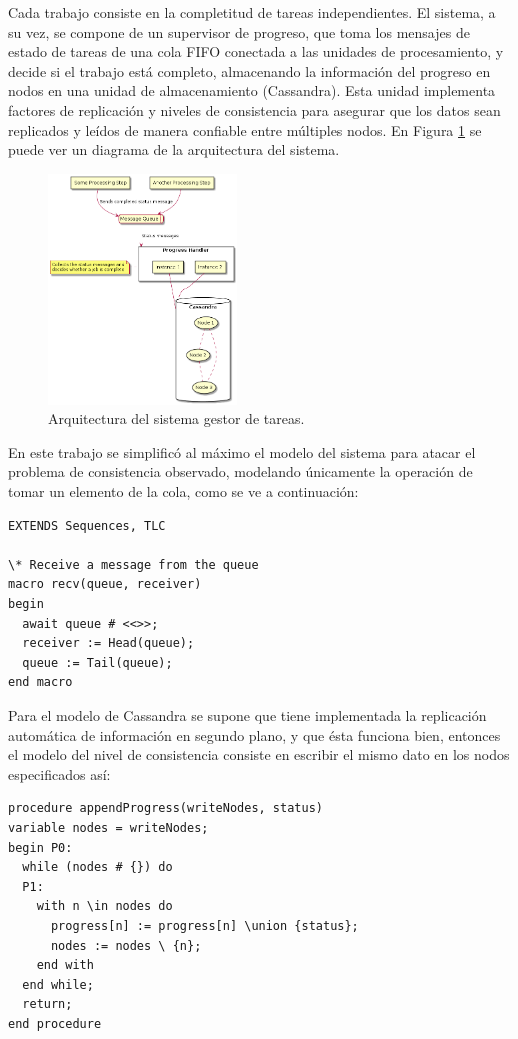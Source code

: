 \documentclass[runningheads]{llncs}
\begin{document}
Cada trabajo consiste en la completitud de tareas independientes. El sistema, a su vez, se compone de un supervisor de progreso, que toma los mensajes de estado de tareas de una cola FIFO conectada a las unidades de procesamiento, y decide si el trabajo está completo, almacenando la información del progreso en nodos en una unidad de almacenamiento (Cassandra). Esta unidad implementa factores de replicación y niveles de consistencia para asegurar que los datos sean replicados y leídos de manera confiable entre múltiples nodos. En Figura \ref{caso_estudio} se puede ver un diagrama de la arquitectura del sistema. 

\begin{figure}
    \caption{Arquitectura del sistema gestor de tareas.}\label{caso_estudio}
    \includegraphics[width=5cm]{formalizing-the-system.png}
    \centering
\end{figure}

En este trabajo se simplificó al máximo el modelo del sistema para atacar el problema de consistencia observado, modelando únicamente la operación de tomar un elemento de la cola, como se ve a continuación:

\begin{lstlisting}
EXTENDS Sequences, TLC

\* Receive a message from the queue
macro recv(queue, receiver)
begin
  await queue # <<>>;
  receiver := Head(queue);
  queue := Tail(queue);
end macro
\end{lstlisting}

Para el modelo de Cassandra se supone que tiene implementada la replicación automática de información en segundo plano, y que ésta funciona bien, entonces  el modelo del nivel de consistencia consiste en escribir el mismo dato en los nodos especificados así:

\begin{lstlisting}
procedure appendProgress(writeNodes, status)
variable nodes = writeNodes;
begin P0:
  while (nodes # {}) do
  P1:
    with n \in nodes do
      progress[n] := progress[n] \union {status};
      nodes := nodes \ {n};
    end with
  end while;
  return;
end procedure
\end{lstlisting}
\end{document}
